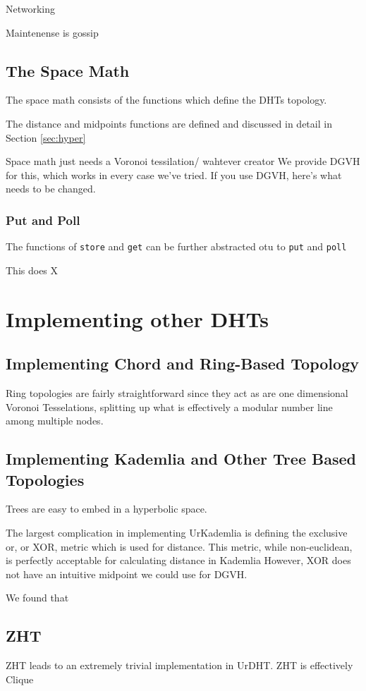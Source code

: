 \documentclass[11pt,conference]{IEEEtran}
\begin{document}
	Networking
	
	Maintenense is gossip
	\subsection{The Space Math}
	The space math consists of the functions which define the DHTs topology.
	
	The distance and midpoints functions are defined and discussed in detail in Section \ref{sec:hyper}	
	
	
	Space math just needs a Voronoi tessilation/ wahtever creator
	We provide DGVH for this, which works in every case we've tried.
	If you use DGVH, here's what needs to be changed.
	
	\subsubsection*{Put and Poll}
	The functions of \texttt{store} and \texttt{get} can be further abstracted otu to \texttt{put} and \texttt{poll}
	
	
	This does X


\section{Implementing other DHTs}
\label{sec:implement}
	\subsection{Implementing Chord and Ring-Based Topology}
	
	Ring topologies are fairly straightforward since they act as are one dimensional Voronoi Tesselations, splitting up what is effectively a modular number line among multiple nodes.
	
	
	\subsection{Implementing Kademlia and Other Tree Based Topologies}
	Trees are easy to embed in a hyperbolic space.
	
	The largest complication in implementing UrKademlia is defining the exclusive or, or XOR, metric which is used for distance.
	This metric, while non-euclidean, is perfectly acceptable for calculating distance in Kademlia \cite{kademlia}
	However, XOR does not have an intuitive midpoint we could use for DGVH.
	
	We found that
	
	\subsection{ZHT}
	ZHT \cite{li2013zht} leads to an extremely trivial implementation in UrDHT.
	ZHT is effectively Clique
	
\end{document}
